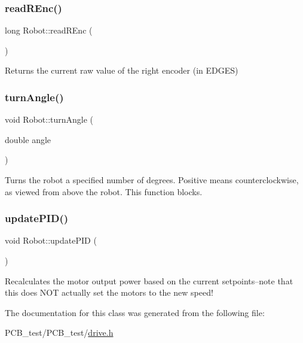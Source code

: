\subsubsection{\texorpdfstring{read\+R\+Enc()}{readREnc()}}
{\footnotesize\ttfamily long Robot\+::read\+R\+Enc (\begin{DoxyParamCaption}{ }\end{DoxyParamCaption})\hspace{0.3cm}{\ttfamily [inline]}}

Returns the current raw value of the right encoder (in E\+D\+G\+ES) \mbox{\label{classRobot_a16a8fc6dbaa682231fc5f02754d3d686}} 
\subsubsection{\texorpdfstring{turn\+Angle()}{turnAngle()}}
{\footnotesize\ttfamily void Robot\+::turn\+Angle (\begin{DoxyParamCaption}\item[{double}]{angle }\end{DoxyParamCaption})\hspace{0.3cm}{\ttfamily [inline]}}

Turns the robot a specified number of degrees. Positive means counterclockwise, as viewed from above the robot. This function blocks. \mbox{\label{classRobot_a7f156346f70997f29e326d0d96acc4d0}} 
\subsubsection{\texorpdfstring{update\+P\+I\+D()}{updatePID()}}
{\footnotesize\ttfamily void Robot\+::update\+P\+ID (\begin{DoxyParamCaption}{ }\end{DoxyParamCaption})\hspace{0.3cm}{\ttfamily [inline]}}

Recalculates the motor output power based on the current setpoints--note that this does N\+OT actually set the motors to the new speed! 

The documentation for this class was generated from the following file\+:\begin{DoxyCompactItemize}
\item 
P\+C\+B\+\_\+test/\+P\+C\+B\+\_\+test/\hyperlink{drive_8h}{drive.\+h}\end{DoxyCompactItemize}

